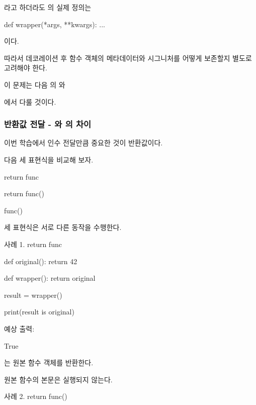 라고 하더라도 의 실제 정의는

\begin{dhkcode}
def wrapper(*args, **kwargs):
    ...
\end{dhkcode}

이다.

따라서 데코레이션 후 함수 객체의 메타데이터와 시그니처를 어떻게 보존할지 별도로 고려해야 한다.

이 문제는 다음 의 와

에서 다룰 것이다.

\subsubsection{반환값 전달 - 와 의 차이}

이번 학습에서 인수 전달만큼 중요한 것이 반환값이다.

다음 세 표현식을 비교해 보자.

\begin{dhkcode}
return func

return func()

func()
\end{dhkcode}

세 표현식은 서로 다른 동작을 수행한다.

\begin{dhknote}
\begin{dhksmry}[centered]
사례 1. return func
\end{dhksmry}
\end{dhknote}

\begin{dhkcode}
def original():
    return 42


def wrapper():
    return original


result = wrapper()

print(result is original)
\end{dhkcode}

예상 출력:

\begin{dhkzsh}
True
\end{dhkzsh}

는 원본 함수 객체를 반환한다.

원본 함수의 본문은 실행되지 않는다.

\begin{dhknote}
\begin{dhksmry}[centered]
사례 2. return func()
\end{dhksmry}
\end{dhknote}

